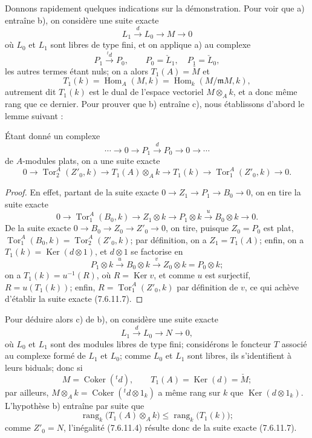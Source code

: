 \begin{remark}[7.6.11]
\[  \tag{7.6.11.5}\label{III.7.6.11.5.fr}
\]
Donnons rapidement quelques indications sur la démonstration. Pour voir que a)
entraîne b), on considère une suite exacte
\[
  L_1\xrightarrow{d}L_0\longrightarrow M\longrightarrow0
\]
où $L_0$ et $L_1$ sont libres de type fini, et on applique a) au complexe
\[
  P_1\xrightarrow{{}^t d}P_0,
  \qquad
  P_0=\check L_1,
  \quad
  P_1=\check L_0,
\]
les autres termes étant nuls; on a alors $T_1(A)=\check M$ et
\[
  T_1(k)
  =
  \operatorname{Hom}_A(M,k)
  =
  \operatorname{Hom}_k(M/\mathfrak mM,k),
\]
autrement dit $T_1(k)$ est le dual de l'espace vectoriel $M\otimes_A k$, et a
donc même rang que ce dernier. Pour prouver que b) entraîne c), nous établissons
d'abord le lemme suivant :

\begin{lemma}[7.6.11.6]
Étant donné un complexe
\[
  \cdots\longrightarrow0\longrightarrow
  P_1\xrightarrow{d}P_0
  \longrightarrow0\longrightarrow\cdots
\]
de $A$-modules plats, on a une suite exacte
\[
  0\longrightarrow\operatorname{Tor}_2^A(Z'_0,k)
  \longrightarrow T_1(A)\otimes_A k
  \longrightarrow T_1(k)
  \longrightarrow\operatorname{Tor}_1^A(Z'_0,k)
  \longrightarrow0.
  \tag{7.6.11.7}\label{III.7.6.11.7.fr}
\]
\end{lemma}

\begin{proof}
En effet, partant de la suite exacte
$0\to Z_1\to P_1\to B_0\to0$, on en tire la suite exacte
\[
  0\longrightarrow\operatorname{Tor}_1^A(B_0,k)
  \longrightarrow Z_1\otimes k
  \longrightarrow P_1\otimes k
  \xrightarrow{u}B_0\otimes k
  \longrightarrow0.
\]
De la suite exacte $0\to B_0\to Z_0\to Z'_0\to0$, on tire, puisque $Z_0=P_0$
est plat,
$\operatorname{Tor}_1^A(B_0,k)=\operatorname{Tor}_2^A(Z'_0,k)$; par définition,
on a $Z_1=T_1(A)$; enfin, on a $T_1(k)=\operatorname{Ker}(d\otimes1)$, et
$d\otimes1$ se factorise en
\[
  P_1\otimes k
  \xrightarrow{u}B_0\otimes k
  \xrightarrow{v}Z_0\otimes k
  =P_0\otimes k;
\]
on a $T_1(k)=u^{-1}(R)$, où $R=\operatorname{Ker}v$, et comme $u$ est
surjectif, $R=u(T_1(k))$; enfin,
$R=\operatorname{Tor}_1^A(Z'_0,k)$ par définition de $v$, ce qui achève
d'établir la suite exacte (7.6.11.7).
\end{proof}

Pour déduire alors c) de b), on considère une suite exacte
\[
  L_1\xrightarrow{d}L_0\longrightarrow N\longrightarrow0,
\]
où $L_0$ et $L_1$ sont des modules libres de type fini; considérons le foncteur
$T$ associé au complexe formé de $L_1$ et $L_0$; comme $L_0$ et $L_1$ sont
libres, ils s'identifient à leurs biduals; donc si
\[
  M=\operatorname{Coker}({}^t d),
  \qquad
  T_1(A)=\operatorname{Ker}(d)=\check M;
\]
par ailleurs, $M\otimes_A k=\operatorname{Coker}({}^t d\otimes1_k)$ a même rang
sur $k$ que $\operatorname{Ker}(d\otimes1_k)$. L'hypothèse b) entraîne par suite
que
\[
  \operatorname{rang}_k\bigl(T_1(A)\otimes_A k\bigr)
  \leq
  \operatorname{rang}_k\bigl(T_1(k)\bigr);
\]
comme $Z'_0=N$, l'inégalité (7.6.11.4) résulte donc de la suite exacte
(7.6.11.7).


\end{remark}
